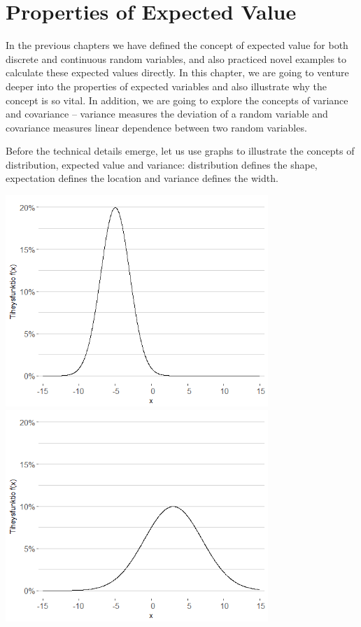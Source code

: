 \documentclass[12pt,a4paper,leqno]{report}
\theoremstyle{plain}
\theoremstyle{definition}
\begin{document}

\chapter{Properties of Expected Value}\label{expected_value}

In the previous chapters we have defined the concept of expected value for both discrete and continuous random variables, and also practiced novel examples to calculate these expected values directly. In this chapter, we are going to venture deeper into the properties of expected variables and also illustrate why the concept is so vital. In addition, we are going to explore the concepts of variance and covariance -- variance measures the deviation of a random variable and covariance measures linear dependence between two random variables.

Before the technical details emerge, let us use graphs to illustrate the concepts of distribution, expected value and variance: distribution defines the shape, expectation defines the location and variance defines the width.

\begin{center}
\includegraphics[height = 8cm]{normi1.png}
\includegraphics[height = 8cm]{normi2.png}
\end{center}
\end{document}
